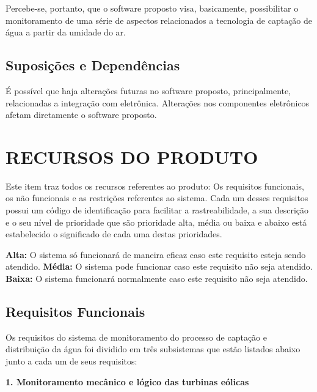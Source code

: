   Percebe-se, portanto, que o software proposto visa, basicamente, possibilitar o monitoramento de uma série de aspectos relacionados a 
  tecnologia de captação de água a partir da umidade do ar.
  
  
  \subsection{Suposições e Dependências}
  É possível que haja alterações futuras no software proposto, principalmente, relacionadas a integração com eletrônica. Alterações 
  nos componentes eletrônicos afetam diretamente o software proposto.
  
  
  \section{RECURSOS DO PRODUTO}
  Este item traz todos os recursos referentes ao produto: Os requisitos funcionais, os não funcionais e as restrições referentes 
  ao sistema. Cada um desses requisitos possui um código de identificação para facilitar a rastreabilidade, a sua descrição e 
  o seu nível de prioridade que são prioridade alta, média ou baixa e abaixo está estabelecido o significado de cada uma 
  destas prioridades.
  
  \textbf{Alta:}  O sistema só funcionará de maneira eficaz caso este requisito esteja sendo atendido.
  \textbf{Média:} O sistema pode funcionar caso este requisito não seja atendido.
  \textbf{Baixa:} O sistema funcionará 	normalmente caso este requisito não seja atendido.
  
  
  \subsection{Requisitos Funcionais}
  
  Os requisitos do sistema de monitoramento do processo de captação e distribuição da água foi dividido em 
  três subsistemas que estão listados abaixo junto a cada um de seus requisitos:
  \pagebreak
  
  \textbf{1. Monitoramento mecânico e lógico das turbinas eólicas}
  
